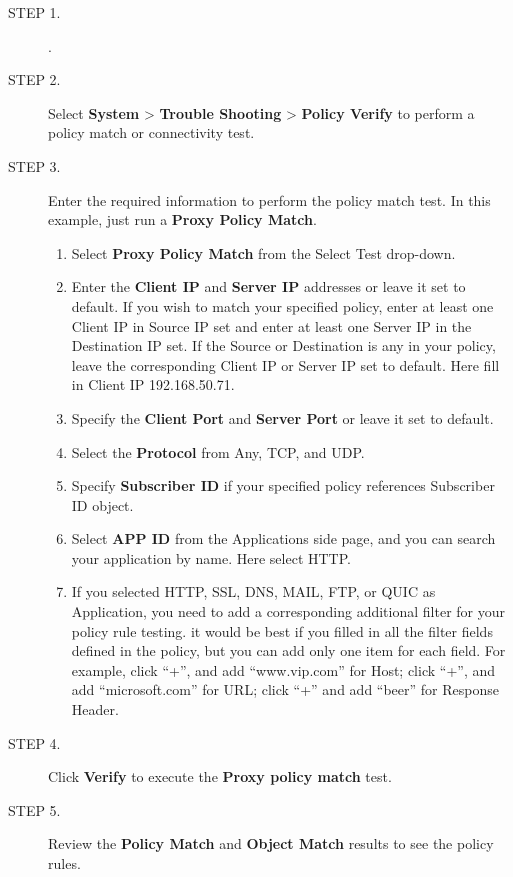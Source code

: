 \begin{description}
    \item[STEP 1.]	\hyperlink{link:Logging into the Web Interface}{\color{linkblue}{Logging into the Web Interface}}.
    \item[STEP 2.]	Select \textbf{System} > \textbf{Trouble Shooting} > \textbf{Policy Verify} to perform a policy match or connectivity test.
    \item[STEP 3.]	Enter the required information to perform the policy match test. In this example, just run a \textbf{Proxy Policy Match}.
    \begin{enumerate} 
        \item Select \textbf{Proxy Policy Match} from the Select Test drop-down.
        \item Enter the \textbf{Client IP} and \textbf{Server IP} addresses or leave it set to default. If you wish to match your specified policy, 
        enter at least one Client IP in Source IP set and enter at least one Server IP in the Destination IP set. 
        If the Source or Destination is any in your policy, leave the corresponding Client IP or Server IP set to default. Here fill in Client IP 192.168.50.71.
        \item Specify the \textbf{Client Port} and \textbf{Server Port} or leave it set to default.
        \item Select the \textbf{Protocol} from Any, TCP, and UDP.
        \item Specify \textbf{Subscriber ID} if your specified policy references Subscriber ID object.
        \item Select \textbf{APP ID} from the Applications side page, and you can search your application by name. Here select HTTP.
        \item If you selected HTTP, SSL, DNS, MAIL, FTP, or QUIC as Application, you need to add a corresponding additional filter for your policy rule testing. 
        it would be best if you filled in all the filter fields defined in the policy, but you can add only one item for each field. 
        For example, click “+”, and add “www.vip.com” for Host; click “+”, and add “microsoft.com” for URL; click “+” and add “beer” for Response Header.
    \end{enumerate}
    \item[STEP 4.]	Click \textbf{Verify} to execute the \textbf{Proxy policy match} test.
    \item[STEP 5.]	Review the \textbf{Policy Match} and \textbf{Object Match} results to see the policy rules.
\end{description} 